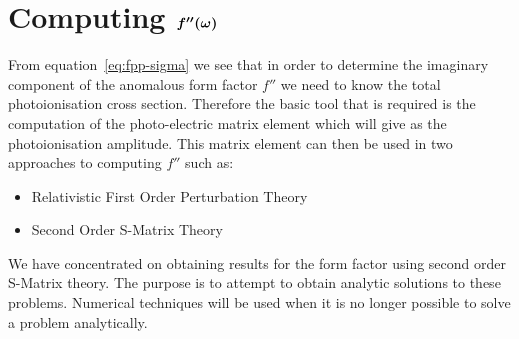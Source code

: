 
\section{Computing $\mbox{\boldmath $f''(\omega)$ } $}
From equation~\ref{eq:fpp-sigma} we see that in order to determine the imaginary
component of the anomalous form factor $f''$ we need to know the total
photoionisation cross section. Therefore the basic tool that is required is the
computation of the photo-electric matrix element which will give as the
photoionisation amplitude. This matrix element can then be used in two
approaches to computing $f''$ such as:
\begin{itemize}
    \item Relativistic First Order Perturbation Theory
    \item Second Order S-Matrix Theory
\end{itemize}
We have concentrated on obtaining results for the form factor
using second order S-Matrix theory.
The purpose is to attempt to obtain analytic solutions to these problems.
Numerical techniques will be used when it is no longer possible to solve a
problem analytically.

